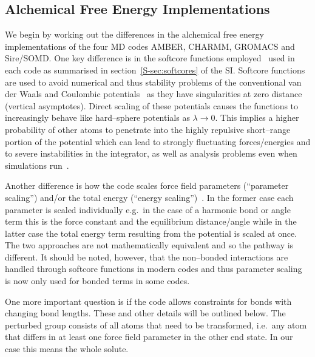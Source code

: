\documentclass[journal=jctcce,manuscript=article]{achemso}
\begin{document}
\subsection{Alchemical Free Energy Implementations}
\label{sec:afe_impl}

We begin by working out the differences in the alchemical free energy
implementations of the four MD codes AMBER, CHARMM, GROMACS and
Sire/SOMD.  One key difference is in the softcore
functions employed~\cite{beutler_avoiding_1994,
  zacharias_separationshifted_1994} used in each code as summarised in
section~\ref{S-sec:softcores} of the SI.  Softcore functions are used to avoid numerical and thus
stability problems of the conventional van der Waals and Coulombic
potentials~\cite{steinbrecher_nonlinear_2007} as they have
singularities at zero distance (vertical asymptotes).  Direct scaling
of these potentials causes the functions to increasingly behave like
hard--sphere potentials as $\lambda\rightarrow 0$.  This implies a
higher probability of other atoms to penetrate into the highly
repulsive short--range portion of the potential which can lead to
strongly fluctuating forces/energies and to severe instabilities in
the integrator, as well as analysis problems even when simulations run~\cite{beutler_avoiding_1994,
  zacharias_separationshifted_1994, steinbrecher_nonlinear_2007}.

Another difference is how the code scales force field parameters (``parameter 
scaling'') and/or the total energy (``energy 
scaling'')~\cite{doi:10.1021/jp981628n}.  In the former case each parameter is 
scaled individually e.g.\ in the case of a harmonic bond or angle term
this is the force constant and the equilibrium distance/angle while in the 
latter case the total energy term resulting from the potential is scaled at 
once.  The two approaches are not mathematically equivalent and so the pathway 
is different.  It should be noted, however, that the non--bonded interactions 
are handled through softcore functions in modern codes and thus parameter 
scaling~\cite{doi:10.1021/j100056a020, JCROSS1986198} is now only used for 
bonded terms in some codes.

One more important question is if the code allows constraints for bonds with 
changing bond lengths.  These and other details will be outlined below.  The 
perturbed group consists of all atoms that need to be transformed, i.e.\ any 
atom that differs in at least one force field parameter in the other end
state.  In our case this means the whole solute.
\end{document}
